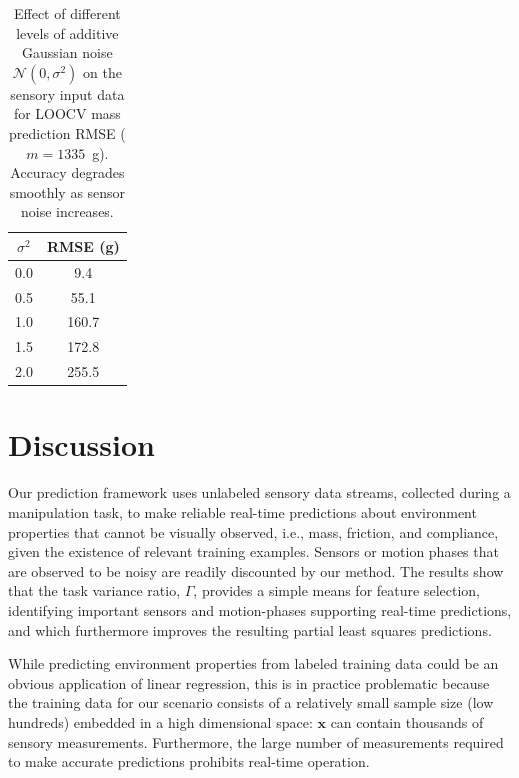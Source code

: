 \begin{table}[tb]
\centering
\begin{tabular}{c|c|}
\hline
\multicolumn{1}{|c|}{$\sigma^2$}   & RMSE (g)\\ \hline
\multicolumn{1}{|c|}{0.0}      & 9.4  \\
\multicolumn{1}{|c|}{0.5}      & 55.1 \\
\multicolumn{1}{|c|}{1.0}      & 160.7  \\
\multicolumn{1}{|c|}{1.5}      & 172.8  \\
\multicolumn{1}{|c|}{2.0}      & 255.5  \\ \hline
\end{tabular}
\caption{Effect of different levels of additive Gaussian noise $\mathcal{N}( 0, \sigma^2   )$ on the sensory input data for LOOCV mass prediction RMSE ($m=1335$~g). Accuracy degrades smoothly as sensor noise increases.}
\label{tbl:add_noise}
\end{table}

\section{Discussion}


Our prediction framework uses unlabeled sensory data streams, collected during a manipulation task, to make reliable real-time predictions about environment properties that cannot be visually observed, i.e., mass, friction, and compliance, given the existence of relevant training examples.
Sensors or motion phases that are observed to be noisy are readily discounted by our method.
The results show that the task variance ratio, $\Gamma$, provides a simple means for feature selection, identifying important sensors and motion-phases supporting real-time predictions, and which furthermore improves the resulting partial least squares predictions.

While predicting environment properties from labeled training data could be an obvious application of linear regression, this is in practice problematic because the training data for our scenario consists of a relatively small sample size (low hundreds) embedded in a high dimensional space: $\mathbf{x}$ can contain thousands of sensory measurements.
Furthermore, the large number of measurements required to make accurate predictions prohibits real-time operation.

